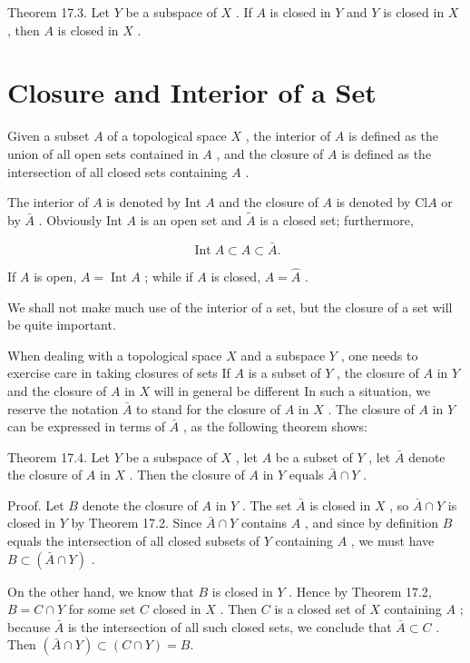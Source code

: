 \documentclass[10pt]{article}
\begin{document}
Theorem 17.3. Let \(Y\) be a subspace of \(X\) . If \(A\) is closed in \(Y\) and \(Y\) is closed in \(X\) , then \(A\) is closed in \(X\) .

\section*{Closure and Interior of a Set}

Given a subset \(A\) of a topological space \(X\) , the interior of \(A\) is defined as the union of all open sets contained in \(A\) , and the closure of \(A\) is defined as the intersection of all closed sets containing \(A\) .

The interior of \(A\) is denoted by Int \(A\) and the closure of \(A\) is denoted by \(\mathrm{{Cl}}A\) or by \(\bar{A}\) . Obviously Int \(A\) is an open set and \(\widetilde{A}\) is a closed set; furthermore,

\[
\operatorname{Int}A \subset  A \subset  \bar{A}.
\]

If \(A\) is open, \(A = \operatorname{Int}A\) ; while if \(A\) is closed, \(A = \widehat{A}\) .

We shall not make much use of the interior of a set, but the closure of a set will be quite important.

When dealing with a topological space \(X\) and a subspace \(Y\) , one needs to exercise care in taking closures of sets If \(A\) is a subset of \(Y\) , the closure of \(A\) in \(Y\) and the closure of \(A\) in \(X\) will in general be different In such a situation, we reserve the notation \(\bar{A}\) to stand for the closure of \(A\) in \(X\) . The closure of \(A\) in \(Y\) can be expressed in terms of \(\bar{A}\) , as the following theorem shows:

Theorem 17.4. Let \(Y\) be a subspace of \(X\) , let \(A\) be a subset of \(Y\) , let \(\bar{A}\) denote the closure of \(A\) in \(X\) . Then the closure of \(A\) in \(Y\) equals \(\bar{A} \cap  Y\) .

Proof. Let \(B\) denote the closure of \(A\) in \(Y\) . The set \(\bar{A}\) is closed in \(X\) , so \(\bar{A} \cap  Y\) is closed in \(Y\) by Theorem 17.2. Since \(\bar{A} \cap  Y\) contains \(A\) , and since by definition \(B\) equals the intersection of all closed subsets of \(Y\) containing \(A\) , we must have \(B \subset  \left( {\bar{A} \cap  Y}\right)\) .

On the other hand, we know that \(B\) is closed in \(Y\) . Hence by Theorem 17.2, \(B = C \cap  Y\) for some set \(C\) closed in \(X\) . Then \(C\) is a closed set of \(X\) containing \(A\) ; because \(\bar{A}\) is the intersection of all such closed sets, we conclude that \(\bar{A} \subset  C\) . Then \(\left( {\bar{A} \cap  Y}\right)  \subset  \left( {C \cap  Y}\right)  = B.\)
\end{document}
